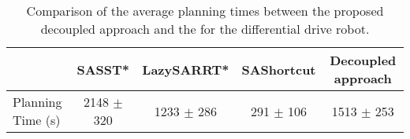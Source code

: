 \begin{table}[h!]
    \begin{tabular}{l|c|c|c|c|}
        \cline{2-5}
                                                & SASST* & LazySARRT* & SAShortcut & Decoupled approach \\ \hline
        \multicolumn{1}{|l|}{Planning Time (s)} &   2148 $\pm$ 320    &    1233 $\pm$ 286       &    291 $\pm$ 106         &        1513 $\pm$ 253           \\ \hline
    \end{tabular}
    \caption{
        \label{tab:lazySAMP_unic}
        Comparison of the average planning times between the proposed decoupled approach and the  for the differential drive robot.
    }
\end{table}